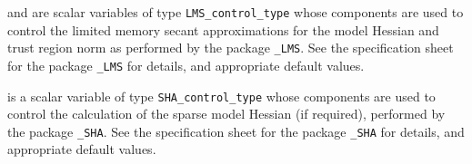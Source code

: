 \documentclass{galahad}
\begin{document}
\begin{description}
 and 
are scalar variables of type
{\tt LMS\_control\_type}
whose components are used to control the limited memory secant
approximations for the model Hessian and trust region norm as
performed by the package
{\tt \libraryname\_LMS}.
See the specification sheet for the package
{\tt \libraryname\_LMS}
for details, and appropriate default values.

 is a scalar variable of type
{\tt SHA\_control\_type}
whose components are used to control the
calculation of the sparse model Hessian (if required),
performed by the package
{\tt \libraryname\_SHA}.
See the specification sheet for the package
{\tt \libraryname\_SHA}
for details, and appropriate default values.

\end{description}

\end{document}
